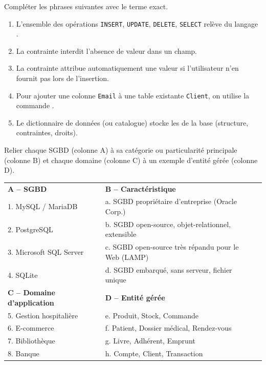 \documentclass[11pt]{article}
\begin{document}
\begin{exercice}
Compléter les phrases suivantes avec le terme exact.
\begin{enumerate}
    \item L'ensemble des opérations \texttt{INSERT}, \texttt{UPDATE}, \texttt{DELETE}, \texttt{SELECT} relève du langage \underline{\hspace{4cm}}.
    \item La contrainte \underline{\hspace{4cm}} interdit l'absence de valeur dans un champ.
    \item La contrainte \underline{\hspace{4cm}} attribue automatiquement une valeur si l'utilisateur n'en fournit pas lors de l'insertion.
    \item Pour ajouter une colonne \texttt{Email} à une table existante \texttt{Client}, on utilise la commande \underline{\hspace{4cm}}.
    \item Le dictionnaire de données (ou catalogue) stocke les \underline{\hspace{4cm}} de la base (structure, contraintes, droits).
\end{enumerate}
\end{exercice}

\begin{exercice}
Relier chaque SGBD (colonne A) à sa catégorie ou particularité principale (colonne B) et chaque domaine (colonne C) à un exemple d'entité gérée (colonne D).

\begin{tabular}{llll}
\textbf{A -- SGBD} & & \textbf{B -- Caractéristique} & \\
1. MySQL / MariaDB & \hspace{2cm} & a. SGBD propriétaire d'entreprise (Oracle Corp.) & \\
2. PostgreSQL & & b. SGBD open-source, objet-relationnel, extensible & \\
3. Microsoft SQL Server & & c. SGBD open-source très répandu pour le Web (LAMP) & \\
4. SQLite & & d. SGBD embarqué, sans serveur, fichier unique & \\
\textbf{C -- Domaine d'application} & & \textbf{D -- Entité gérée} & \\
5. Gestion hospitalière & & e. Produit, Stock, Commande & \\
6. E-commerce & & f. Patient, Dossier médical, Rendez-vous & \\
7. Bibliothèque & & g. Livre, Adhérent, Emprunt & \\
8. Banque & & h. Compte, Client, Transaction &
\end{tabular}
\end{exercice}
\end{document}
